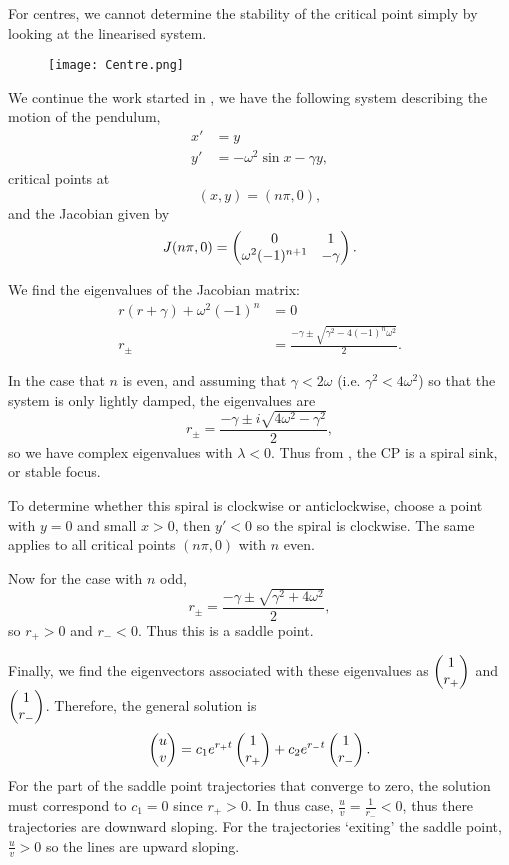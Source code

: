 \begin{remark}
	For centres, we cannot determine the stability of the critical point simply by looking at the linearised system.
\end{remark}

\begin{figure}[!ht]
	\centering
	\texttt{[image: Centre.png]}
	\label{fig:centrepiracy}
\end{figure}

\begin{eg}\label{eg:dampedpendulum2}
	We continue the work started in , we have the following system describing the motion of the pendulum, 
	\begin{align*}
		x' &= y \\
		y' &= -\omega^2 \sin{x} - \gamma y,
	\end{align*}
	critical points at
	\[
	(x,y) = (n\pi, 0),
	\]
	and the Jacobian given by
	\[
	J(n\pi,0) = \begin{pmatrix}0 & 1 \\ \omega^2 (-1)^{n+1} & -\gamma\end{pmatrix}.
	\]
	
	We find the eigenvalues of the Jacobian matrix:
	\begin{align*}
		r(r+\gamma) + \omega^2 (-1)^n &= 0 \\
		r_{\pm} &= \frac{-\gamma \pm \sqrt{\gamma^2 - 4(-1)^n\omega^2}}{2}.
	\end{align*}
	
	In the case that $n$ is even, and assuming that $\gamma < 2\omega$ (i.e. $\gamma^2 < 4\omega^2$) so that the system is only lightly damped, the eigenvalues are
	\[
	r_{\pm} = \frac{-\gamma \pm i\sqrt{4\omega^2 - \gamma^2}}{2},
	\]
	so we have complex eigenvalues with $\lambda<0$. Thus from , the CP is a spiral sink, or stable focus.
	
	To determine whether this spiral is clockwise or anticlockwise, choose a point with $y=0$ and small $x>0$, then $y'<0$ so the spiral is clockwise. The same applies to all critical points $(n\pi, 0)$ with $n$ even.
	
	Now for the case with $n$ odd,
	\[
	r_{\pm} = \frac{-\gamma \pm \sqrt{\gamma^2 + 4\omega^2}}{2},
	\]
	so $r_+>0$ and $r_-<0$. Thus this is a saddle point.
	
	Finally, we find the eigenvectors associated with these eigenvalues as $\begin{pmatrix}1\\r_+\end{pmatrix}$ and $\begin{pmatrix}1\\r_-\end{pmatrix}$. Therefore, the general solution is
	\[
	\begin{pmatrix}u\\v\end{pmatrix} = c_1e^{r_+t}\begin{pmatrix}1\\r_+\end{pmatrix} + c_2e^{r_-t}\begin{pmatrix}1\\r_-\end{pmatrix}.
	\]
	For the part of the saddle point trajectories that converge to zero, the solution must correspond to $c_1=0$ since $r_+>0$. In thus case, $\frac{u}{v} = \frac{1}{r_-} < 0$, thus there trajectories are downward sloping. For the trajectories `exiting' the saddle point, $\frac{u}{v} > 0$ so the lines are upward sloping.
	

\end{eg}
